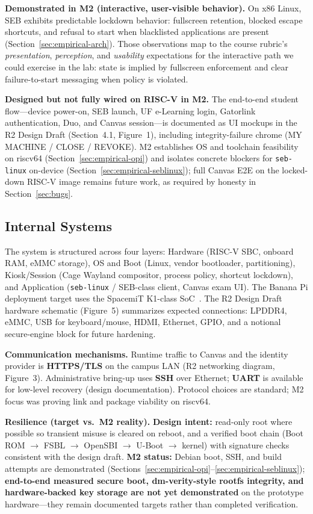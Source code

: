 \documentclass[11pt]{article}
\begin{document}
\textbf{Demonstrated in M2 (interactive, user-visible behavior).} On x86 Linux, SEB exhibits predictable lockdown behavior: fullscreen retention, blocked escape shortcuts, and refusal to start when blacklisted applications are present (Section~\ref{sec:empirical-arch}). Those observations map to the course rubric's \emph{presentation}, \emph{perception}, and \emph{usability} expectations for the interactive path we could exercise in the lab: state is implied by fullscreen enforcement and clear failure-to-start messaging when policy is violated.

\textbf{Designed but not fully wired on RISC-V in M2.} The end-to-end student flow---device power-on, SEB launch, UF e-Learning login, Gatorlink authentication, Duo, and Canvas session---is documented as UI mockups in the R2 Design Draft (Section~4.1, Figure~1), including integrity-failure chrome (MY MACHINE / CLOSE / REVOKE). M2 establishes OS and toolchain feasibility on riscv64 (Section~\ref{sec:empirical-opi}) and isolates concrete blockers for \texttt{seb-linux} on-device (Section~\ref{sec:empirical-seblinux}); full Canvas E2E on the locked-down RISC-V image remains future work, as required by honesty in Section~\ref{sec:bugs}.

\subsection{Internal Systems}

The system is structured across four layers: Hardware (RISC-V SBC, onboard RAM, eMMC storage), OS and Boot (Linux, vendor bootloader, partitioning), Kiosk/Session (Cage Wayland compositor, process policy, shortcut lockdown), and Application (\texttt{seb-linux} / SEB-class client, Canvas exam UI). The Banana Pi deployment target uses the SpacemiT K1-class SoC~\cite{spacemit_k1}. The R2 Design Draft hardware schematic (Figure~5) summarizes expected connections: LPDDR4, eMMC, USB for keyboard/mouse, HDMI, Ethernet, GPIO, and a notional secure-engine block for future hardening.

\textbf{Communication mechanisms.} Runtime traffic to Canvas and the identity provider is \textbf{HTTPS/TLS} on the campus LAN (R2 networking diagram, Figure~3). Administrative bring-up uses \textbf{SSH} over Ethernet; \textbf{UART} is available for low-level recovery (design documentation). Protocol choices are standard; M2 focus was proving link and package viability on riscv64.

\textbf{Resilience (target vs.\ M2 reality).} \textbf{Design intent:} read-only root where possible so transient misuse is cleared on reboot, and a verified boot chain (Boot ROM $\rightarrow$ FSBL $\rightarrow$ OpenSBI $\rightarrow$ U-Boot $\rightarrow$ kernel) with signature checks consistent with the design draft. \textbf{M2 status:} Debian boot, SSH, and build attempts are demonstrated (Sections~\ref{sec:empirical-opi}--\ref{sec:empirical-seblinux}); \textbf{end-to-end measured secure boot, dm-verity-style rootfs integrity, and hardware-backed key storage are not yet demonstrated} on the prototype hardware---they remain documented targets rather than completed verification.
\end{document}
